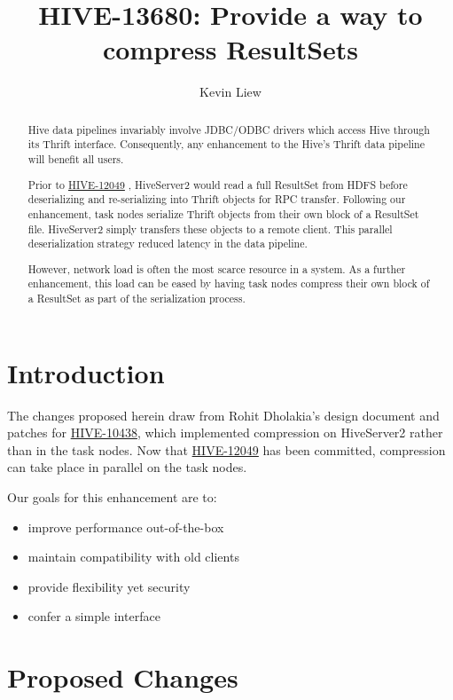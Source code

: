 \documentclass[11pt,a4paper]{article}
\title{HIVE-13680: Provide a way to compress ResultSets}
\author{Kevin Liew}
\begin{document}
\maketitle

\begin{abstract}
	Hive data pipelines invariably involve JDBC/ODBC drivers which access Hive through its Thrift interface. 
	Consequently, any enhancement to the Hive's Thrift data pipeline will benefit all users.
	
	Prior to 
	\href{https://issues.apache.org/jira/browse/HIVE-12049}{HIVE-12049}
	, HiveServer2 would read a full ResultSet from HDFS before deserializing and re-serializing into Thrift objects for RPC transfer.
	Following our enhancement, task nodes serialize Thrift objects from their own block of a ResultSet file. 
	HiveServer2 simply transfers these objects to a remote client. 
	This parallel deserialization strategy reduced latency in the data pipeline.
	
	However, network load is often the most scarce resource in a system. 
	As a further enhancement, this load can be eased by having task nodes compress their own block of a ResultSet as part of the serialization process.
\end{abstract}

\section{Introduction}
	The changes proposed herein draw from Rohit Dholakia's design document and patches for
	\href{https://issues.apache.org/jira/browse/HIVE-10438}{HIVE-10438}, which implemented compression on HiveServer2 rather than in the task nodes.
	Now that
	\href{https://issues.apache.org/jira/browse/HIVE-12049}{HIVE-12049}
	has been committed, compression can take place in parallel on the task nodes.
	
	Our goals for this enhancement are to:
	\begin{itemize}
		\item improve performance out-of-the-box
		\item maintain compatibility with old clients
		\item provide flexibility yet security
		\item confer a simple interface
	\end{itemize}

\section{Proposed Changes}
\end{document}

